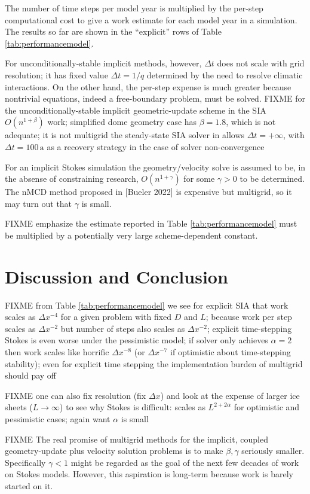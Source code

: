 \documentclass[twocolumn,letterpaper]{igs}
\begin{document}
The number of time steps per model year is multiplied by the per-step computational cost to give a work estimate for each model year in a simulation.  The results so far are shown in the ``explicit'' rows of Table \ref{tab:performancemodel}.

For unconditionally-stable implicit methods, however, $\Delta t$ does not scale with grid resolution; it has fixed value $\Delta t = 1/q$ determined by the need to resolve climatic interactions.  On the other hand, the per-step expense is much greater because nontrivial equations, indeed a free-boundary problem, must be solved.  FIXME for the unconditionally-stable implicit geometric-update scheme in the SIA $O(n^{1+\beta})$ work; \cite{Bueler2016} simplified dome geometry case has $\beta=1.8$, which is not adequate; it is not multigrid
the steady-state SIA solver in \cite{Bueler2016} allows $\Delta t=+\infty$, with $\Delta t = 100 \,\text{a}$ as a recovery strategy in the case of solver non-convergence

For an implicit Stokes simulation the geometry/velocity solve is assumed to be, in the absense of constraining research, $O(n^{1+\gamma})$ for some $\gamma>0$ to be determined.  The nMCD method proposed in [Bueler 2022] is expensive but multigrid, so it may turn out that $\gamma$ is small.

FIXME emphasize the estimate reported in Table \ref{tab:performancemodel} must be multiplied by a potentially very large scheme-dependent constant.


\section{Discussion and Conclusion}

FIXME from Table \ref{tab:performancemodel} we see for explicit SIA that work scales as $\Delta x^{-4}$ for a given problem with fixed $D$ and $L$; because work per step scales as $\Delta x^{-2}$ but number of steps also scales as $\Delta x^{-2}$; explicit time-stepping Stokes is even worse under the pessimistic model; if solver only achieves $\alpha=2$ then work scales like horrific $\Delta x^{-8}$ (or $\Delta x^{-7}$ if optimistic about time-stepping stability); even for explicit time stepping the implementation burden of multigrid should pay off

FIXME one can also fix resolution (fix $\Delta x$) and look at the expense of larger ice sheets ($L\to \infty$) to see why Stokes is difficult: scales as $L^{2+2\alpha}$ for optimistic and pessimistic cases; again want $\alpha$ is small

FIXME The real promise of multigrid methods for the implicit, coupled geometry-update plus velocity solution problems is to make $\beta,\gamma$ seriously smaller.  Specifically $\gamma < 1$ might be regarded as the goal of the next few decades of work on Stokes models.  However, this aspiration is long-term because work is barely started on it.



\end{document}
